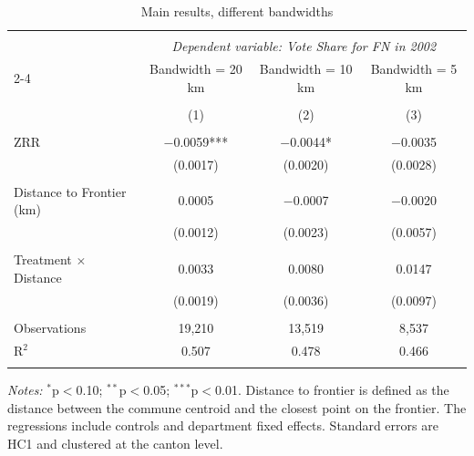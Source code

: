 \begin{table}[!htbp]
\centering
\footnotesize
\caption{Main results, different bandwidths}
\label{tab:rdd_results_diffbandwidth}
\begin{threeparttable}
\begin{tabular}{@{\extracolsep{2pt}}lccc}
\\[-1.8ex]\hline
\hline \\[-1.8ex]
 & \multicolumn{3}{c}{\textit{Dependent variable: Vote Share for FN in 2002}} \\
\cline{2-4}
 & Bandwidth = 20 km & Bandwidth = 10 km & Bandwidth = 5 km \\
\\[-1.8ex] & (1) & (2) & (3)\\
\hline \\[-1.8ex]
ZRR & $-$0.0059*** & $-$0.0044* & $-$0.0035 \\
  & (0.0017) & (0.0020) & (0.0028) \\
  & & & \\
Distance to Frontier (km) & 0.0005 & $-$0.0007 & $-$0.0020 \\
  & (0.0012) & (0.0023) & (0.0057) \\
  & & & \\
Treatment $\times$ Distance & 0.0033 & 0.0080 & 0.0147 \\
  & (0.0019) & (0.0036) & (0.0097) \\
\hline \\[-1.8ex]
Observations & 19,210 & 13,519 & 8,537 \\
R$^{2}$ & 0.507 & 0.478 & 0.466 \\
\hline
\hline \\[-1.8ex]
\end{tabular}
\begin{tablenotes}
  \footnotesize
  \item \textit{Notes:} $^{*}$p$<$0.10; $^{**}$p$<$0.05; $^{***}$p$<$0.01. Distance to frontier is defined as the distance between the commune centroid and the closest point on the frontier. The regressions include controls and department fixed effects. Standard errors are HC1 and clustered at the canton level.
\end{tablenotes}
\end{threeparttable}
\end{table}

